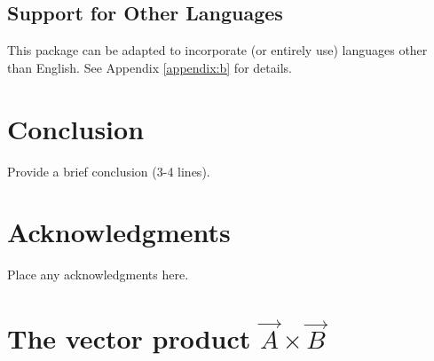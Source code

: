\documentclass[balance,upint,subscriptcorrection,varvw,mathalfa=cal=boondoxo,spanish,french,vietnamese,russian,greek,pdf-a,fontspec,colorlinks]{asmeconf}
\begin{document}
\subsection{Support for Other Languages}  This package can be adapted to incorporate (or entirely use) languages other than English. See Appendix \ref{appendix:b} for details.



\section{Conclusion}
Provide a brief conclusion (3-4 lines).



\section*{Acknowledgments}
Place any acknowledgments here.



\nocite{*}%



\appendix


\section[The Vector Product A\times B]{The vector product $\vec{A}\times\vec{B}$}\label{appendix:a}
\end{document}
